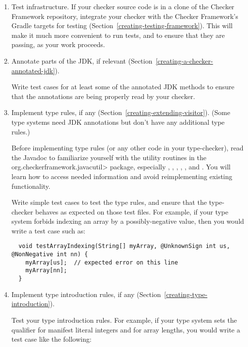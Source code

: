\begin{enumerate}
\item
  Test infrastructure.
  If your checker source code is in a clone of the Checker Framework
  repository, integrate your checker with the Checker Framework's Gradle
  targets for testing (Section~\ref{creating-testing-framework}).  This
  will make it much more convenient to run tests, and to ensure that they
  are passing, as your work proceeds.

\item
  Annotate parts of the JDK, if relevant
  (Section~\ref{creating-a-checker-annotated-jdk}).

  Write test cases for at least some of the annotated JDK methods to ensure
  that the annotations are being properly read by your checker.

\item
  Implement type rules, if any (Section~\ref{creating-extending-visitor}).
  (Some type systems need JDK annotations but don't have any additional
  type rules.)

  Before implementing type rules (or any other code in your type-checker),
  read the Javadoc to familiarize yourself with the utility routines in the
  \<org.checkerframework.javacutil> package, especially
  ,
  ,
  ,
  ,
  , and
  .
  You will learn how to access needed information and avoid
  reimplementing existing functionality.

  Write simple test cases to test the type rules, and ensure that the
  type-checker behaves as expected on those test files.
  For example, if your type system forbids indexing an array by a
  possibly-negative value, then you would write a test case such as:

\begin{Verbatim}
  void testArrayIndexing(String[] myArray, @UnknownSign int us, @NonNegative int nn) {
    myArray[us];  // expected error on this line
    myArray[nn];
  }
\end{Verbatim}

\item
  Implement type introduction rules, if any (Section~\ref{creating-type-introduction}).

  Test your type introduction rules.
  For example, if your type system sets the qualifier for manifest literal
  integers and for array lengths, you would write a test case like the following:


\end{enumerate}

